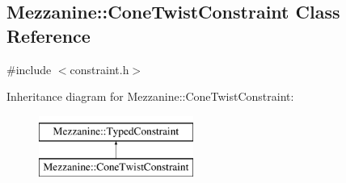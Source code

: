 \hypertarget{classMezzanine_1_1ConeTwistConstraint}{
\subsection{Mezzanine::ConeTwistConstraint Class Reference}
\label{classMezzanine_1_1ConeTwistConstraint}
}


{\ttfamily \#include $<$constraint.h$>$}

Inheritance diagram for Mezzanine::ConeTwistConstraint:\begin{figure}[H]
\begin{center}
\leavevmode
\includegraphics[height=2.000000cm]{classMezzanine_1_1ConeTwistConstraint}
\end{center}
\end{figure}
